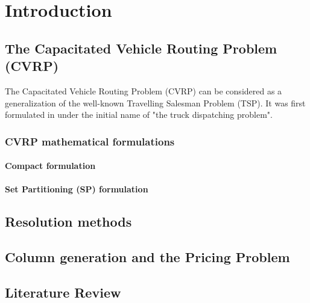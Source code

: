 \chapter{Introduction}

\section{The Capacitated Vehicle Routing Problem (CVRP)}

The Capacitated Vehicle Routing Problem (CVRP) can be considered as a generalization of
the well-known Travelling Salesman Problem (TSP).
It was first formulated in \cite{dantzig1959truck}
under the initial name of "the truck dispatching problem".



\subsection{CVRP mathematical formulations}


\subsubsection{Compact formulation}

\subsubsection{Set Partitioning (SP) formulation}


\section{Resolution methods}

\section{Column generation and the Pricing Problem}

\section{Literature Review}
